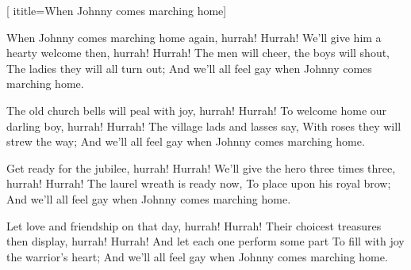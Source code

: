  [
ititle={When Johnny comes marching home}]

\beginverse
When Johnny comes marching home again, hurrah! Hurrah!
We'll give him a hearty welcome then, hurrah! Hurrah!
The men will cheer, the boys will shout,
The ladies they will all turn out;
And we'll all feel gay when Johnny comes marching home.
\endverse

\beginverse
The old church bells will peal with joy, hurrah! Hurrah!
To welcome home our darling boy, hurrah! Hurrah!
The village lads and lasses say,
With roses they will strew the way;
And we'll all feel gay when Johnny comes marching home.
\endverse

\beginverse
Get ready for the jubilee, hurrah! Hurrah!
We'll give the hero three times three, hurrah! Hurrah!
The laurel wreath is ready now,
To place upon his royal brow;
And we'll all feel gay when Johnny comes marching home.
\endverse

\beginverse
Let love and friendship on that day, hurrah! Hurrah!
Their choicest treasures then display, hurrah! Hurrah!
And let each one perform some part
To fill with joy the warrior's heart;
And we'll all feel gay when Johnny comes marching home.
\endverse
\endsong